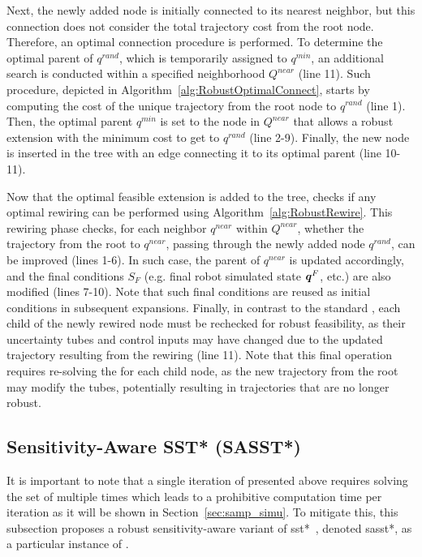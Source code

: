 Next, the newly added node is initially connected to its nearest neighbor, but this connection does not consider the total trajectory cost from the root node. 
Therefore, an optimal connection procedure is performed. 
To determine the optimal parent of $q^{rand}$, which is temporarily assigned to $q^{min}$, an additional search is conducted within a specified neighborhood $Q^{near}$ (line 11).
Such procedure, depicted in Algorithm~\ref{alg:RobustOptimalConnect}, starts by computing the cost of the unique trajectory from the root node to $q^{rand}$ (line 1).
Then, the optimal parent $q^{min}$ is set to the node in $Q^{near}$ that allows a robust extension with the minimum cost to get to $q^{rand}$ (line 2-9).
Finally, the new node is inserted in the tree with an edge connecting it to its optimal parent (line 10-11).

Now that the optimal feasible extension is added to the tree,  checks if any optimal rewiring can be performed using Algorithm~\ref{alg:RobustRewire}.
This rewiring phase checks, for each neighbor $q^{near}$ within $Q^{near}$, whether the trajectory from the root to $q^{near}$, passing through the newly added node $q^{rand}$, can be improved (lines 1-6).
In such case, the parent of $q^{near}$ is updated accordingly, and the final  conditions $S_F$ (e.g. final robot simulated state $\boldsymbol{q}^F$, etc.) are also modified (lines 7-10).
Note that such final conditions are reused as initial conditions in subsequent expansions.
Finally, in contrast to the standard , each child of the newly rewired node must be rechecked for robust feasibility, as their uncertainty tubes and control inputs may have changed due to the updated trajectory resulting from the rewiring (line 11).
Note that this final operation requires re-solving the  for each child node, as the new trajectory from the root may modify the tubes, potentially resulting in trajectories that are no longer robust.

\subsection{Sensitivity-Aware SST* (SASST*)}\label{sec:sasst*}

It is important to note that a single iteration of  presented above requires solving the set of  multiple times which leads to a prohibitive computation time per iteration as it will be shown in Section~\ref{sec:samp_simu}.
To mitigate this, this subsection proposes a robust sensitivity-aware variant of \gls{sst*}~\cite{cSST}, denoted \gls{sasst*}, as a particular instance of . 

